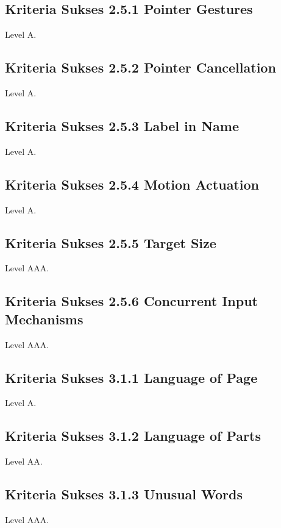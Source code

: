 \subsection{Kriteria Sukses 2.5.1 Pointer Gestures}
\label{sec:kriteria_2.5.1}
Level A.

\subsection{Kriteria Sukses 2.5.2 Pointer Cancellation}
\label{sec:kriteria_2.5.2}
Level A.

\subsection{Kriteria Sukses 2.5.3 Label in Name}
\label{sec:kriteria_2.5.3}
Level A.

\subsection{Kriteria Sukses 2.5.4 Motion Actuation}
\label{sec:kriteria_2.5.4}
Level A.

\subsection{Kriteria Sukses 2.5.5 Target Size}
\label{sec:kriteria_2.5.5}
Level AAA.

\subsection{Kriteria Sukses 2.5.6 Concurrent Input Mechanisms}
\label{sec:kriteria_2.5.6}
Level AAA.

\subsection{Kriteria Sukses 3.1.1 Language of Page}
\label{sec:kriteria_3.1.1}
Level A.

\subsection{Kriteria Sukses 3.1.2 Language of Parts}
\label{sec:kriteria_3.1.2}
Level AA.

\subsection{Kriteria Sukses 3.1.3 Unusual Words}
\label{sec:kriteria_3.1.3}
Level AAA.

